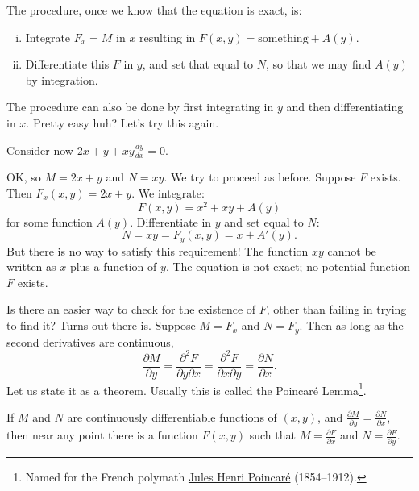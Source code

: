 The procedure, once we know that the equation is exact, is:
\begin{enumerate}[(i)]
\item Integrate $F_x = M$ in $x$ resulting in $F(x,y) = \text{something} + A(y)$.
\item Differentiate this $F$ in $y$, and set that equal to
$N$, so that we may find $A(y)$ by integration.
\end{enumerate}
The procedure can also be done by first integrating in $y$ and then
differentiating in $x$.
Pretty easy huh?  Let's try this again.

\begin{example} \label{exact:example:2xyandxy}
Consider now $2x+y + xy \frac{dy}{dx} = 0$.

OK\@, so $M = 2x+y$ and $N=xy$.  We try to proceed as before.
Suppose 
$F$ exists.  Then $F_x (x,y) = 2x+y$.
We integrate:
\begin{equation*}
F(x,y) = x^2 + xy + A(y)
\end{equation*}
for some function $A(y)$.  Differentiate in $y$ and set equal to $N$:
\begin{equation*}
N = xy = F_y (x,y) = x+A'(y) .
\end{equation*}
But there is no way to satisfy this requirement!  The function $xy$ cannot
be written as $x$ plus a function of $y$.  The equation is not
exact; no potential function $F$ exists.
\end{example}

Is there an easier way to check for the existence of $F$, other than failing
in trying to
find it?  Turns out there is.  Suppose
$M = F_x$ and
$N = F_y$.  Then
as long as the second derivatives are continuous,
\begin{equation*}
\frac{\partial M}{\partial y}
=
\frac{\partial^2 F}{\partial y \partial x}
=
\frac{\partial^2 F}{\partial x \partial y}
=
\frac{\partial N}{\partial x} .
\end{equation*}
Let us state it as
a theorem.  Usually this is called the Poincar\'e Lemma\footnote{Named for the French polymath
\href{https://en.wikipedia.org/wiki/Henri_Poincar\%C3\%A9}{Jules Henri
Poincar\'e} (1854--1912).}.

\begin{theorem}[Poincar\'e]
If $M$ and $N$ are continuously differentiable functions of $(x,y)$, and
$\frac{\partial M}{\partial y} = \frac{\partial N}{\partial x}$,
then near any point there is a function $F(x,y)$
such that
$M = \frac{\partial F}{\partial x}$ and
$N = \frac{\partial F}{\partial y}$.
\end{theorem}

